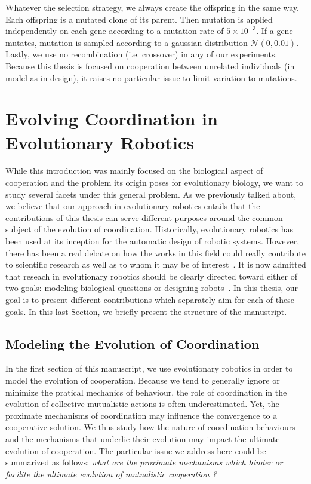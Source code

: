 
    Whatever the selection strategy, we always create the offspring in the same way. Each offspring is a mutated clone of its parent. Then mutation is applied independently on each gene according to a mutation rate of \(5 \times 10^{-3}\). If a gene mutates, mutation is sampled according to a gaussian distribution \(\mathcal{N}(0, 0.01)\). Lastly, we use no recombination (i.e. crossover) in any of our experiments. Because this thesis is focused on cooperation between unrelated individuals (in model as in design), it raises no particular issue to limit variation to mutations.


\section{Evolving Coordination in Evolutionary Robotics}

  While this introduction was mainly focused on the biological aspect of cooperation and the problem its origin poses for evolutionary biology, we want to study several facets under this general problem. As we previously talked about, we believe that our approach in evolutionary robotics entails that the contributions of this thesis can serve different purposes around the common subject of the evolution of coordination. Historically, evolutionary robotics has been used at its inception for the automatic design of robotic systems. However, there has been a real debate on how the works in this field could really contribute to scientific research as well as to whom it may be of interest~\parencite{Trianni2014b, Doncieux2015a}. It is now admitted that reseach in evolutionary robotics should be clearly directed toward either of two goals: modeling biological questions or designing robots~\parencite{Trianni2014b}. In this thesis, our goal is to present different contributions which separately aim for each of these goals. In this last Section, we briefly present the structure of the manustript.
  
  \subsection{Modeling the Evolution of Coordination}

    In the first section of this manuscript, we use evolutionary robotics in order to model the evolution of cooperation. Because we tend to generally ignore or minimize the pratical mechanics of behaviour, the role of coordination in the evolution of collective mutualistic actions is often underestimated. Yet, the proximate mechanisms of coordination may influence the convergence to a cooperative solution. We thus study how the nature of coordination behaviours and the mechanisms that underlie their evolution may impact the ultimate evolution of cooperation. The particular issue we address here could be summarized as follows: \emph{what are the proximate mechanisms which hinder or facilite the ultimate evolution of mutualistic cooperation ?}

